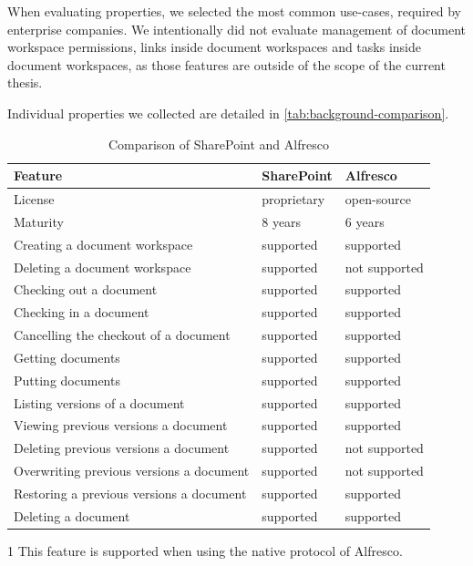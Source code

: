When evaluating properties, we selected the most common use-cases, required by
enterprise companies. We intentionally did not evaluate management of document
workspace permissions, links inside document workspaces and tasks inside
document workspaces, as those features are outside of the scope of the current
thesis.

Individual properties we collected are detailed in
\autoref{tab:background-comparison}.

\begin{table}[H]
\begin{threeparttable}
  \begin{center}
    \begin{tabular}{| l | l | l |}
    \hline
    \textbf{Feature} & \textbf{SharePoint} & \textbf{Alfresco} \\ \hline
    License & proprietary & open-source \\ \hline
    Maturity & 8 years \cite{sphist} & 6 years \\ \hline
    Creating a document workspace & supported & supported \\ \hline
    Deleting a document workspace & supported & not supported\tnote{1}\\ \hline
    Checking out a document & supported & supported \\ \hline
    Checking in a document & supported & supported \\ \hline
    Cancelling the checkout of a document & supported & supported \\ \hline
    Getting documents & supported & supported \\ \hline
    Putting documents & supported & supported \\ \hline
    Listing versions of a document & supported & supported \\ \hline
    Viewing previous versions a document & supported & supported \\ \hline
    Deleting previous versions a document & supported & not supported \\ \hline
    Overwriting previous versions a document & supported & not supported \\ \hline
    Restoring a previous versions a document & supported & supported \\ \hline
    Deleting a document & supported & supported \\ \hline
    \end{tabular}
    \begin{tablenotes}
    \item [1] This feature is supported when using the native protocol of Alfresco.
    \end{tablenotes}
  \end{center}
  \caption{Comparison of SharePoint and Alfresco}
  \label{tab:background-comparison}
\end{threeparttable}
\end{table}

